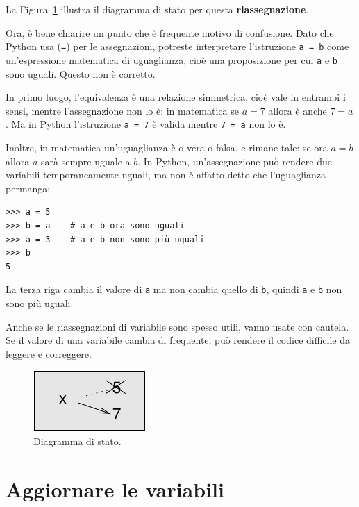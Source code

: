 \documentclass[10pt]{book}
\begin{document}
La Figura~\ref{fig.assign2} illustra il diagramma di stato per questa {\bf riassegnazione}. 

Ora, è bene chiarire un punto che è frequente motivo di confusione.
Dato che Python usa ({\tt =}) per le assegnazioni, potreste interpretare l'istruzione {\tt a = b} come un'espressione matematica di uguaglianza, cioè una proposizione per cui {\tt a} e {\tt b} sono uguali. Questo non è corretto.

In primo luogo, l'equivalenza è una relazione simmetrica, cioè vale in entrambi i sensi, mentre l'assegnazione non lo è: in matematica se $a=7$ allora è anche $7=a$. Ma in Python l'istruzione {\tt a = 7} è valida mentre {\tt 7 = a} non lo è.

Inoltre, in matematica un'uguaglianza è o vera o falsa, e rimane tale: se ora $a=b$ allora $a$ sarà sempre uguale a $b$.
In Python, un'assegnazione può rendere due variabili temporaneamente uguali, ma non è affatto detto che l'uguaglianza permanga:

\begin{verbatim}
>>> a = 5
>>> b = a    # a e b ora sono uguali
>>> a = 3    # a e b non sono più uguali
>>> b
5
\end{verbatim}
%
La terza riga cambia il valore di {\tt a} ma non cambia quello di {\tt b}, quindi {\tt a} e {\tt b} non sono più uguali.

Anche se le riassegnazioni di variabile sono spesso utili, vanno usate con cautela. Se il valore di una variabile cambia di frequente, può rendere il codice difficile da leggere e correggere.

\begin{figure}
\centerline
{\includegraphics[scale=0.8]{figs/assign2.pdf}}
\caption{Diagramma di stato.}
\label{fig.assign2}
\end{figure}



\section{Aggiornare le variabili}
\label{update}

\end{document}
